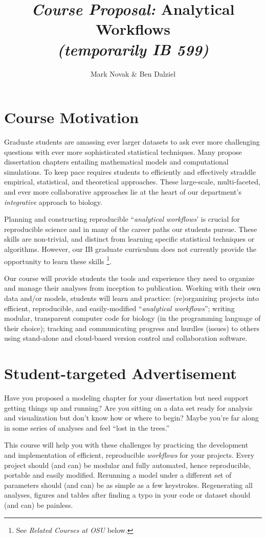 \documentclass[10pt]{article}
\author{Mark Novak \& Ben Dalziel}
\title{\emph{Course Proposal:}  Analytical Workflows\\\emph{\small{(temporarily} IB 599)}}
\date{}
\begin{document}
\maketitle

\section*{Course Motivation}
Graduate students are amassing ever larger datasets to ask ever more challenging questions with ever more sophisticated statistical techniques. Many propose dissertation chapters entailing mathematical models and computational simulations. To keep pace requires students to efficiently and effectively straddle empirical, statistical, and theoretical approaches. These large-scale, multi-faceted, and ever more collaborative approaches lie at the heart of our department's \emph{integrative} approach to biology.

Planning and constructing reproducible ``\emph{analytical workflows}' is crucial for reproducible science and in many of the career paths our students pursue. These skills are non-trivial, and distinct from learning specific statistical techniques or algorithms. However, our IB graduate curriculum does not currently provide the opportunity to learn these skills \footnote{See \emph{Related Courses at OSU} below.}. 

Our course will provide students the tools and experience they need to organize and manage their analyses from inception to publication.  Working with their own data and/or models, students will learn and practice: (re)organizing projects into efficient, reproducible, and easily-modified ``\emph{analytical workflows}''; writing modular, transparent computer code for biology (in the programming language of their choice); tracking and communicating progress and hurdles (issues) to others using stand-alone and cloud-based version control and collaboration software.

\section*{Student-targeted Advertisement}
Have you proposed a modeling chapter for your dissertation but need support getting things up and running?  Are you sitting on a data set ready for analysis and visualization but don't know how or where to begin?  Maybe you're far along in some series of analyses and feel ``lost in the trees.''

This course will help you with these challenges by practicing the development and implementation of efficient, reproducible \emph{workflows} for your projects.  Every project should (and can) be modular and fully automated, hence reproducible, portable and easily modified.  Rerunning a model under a different set of parameters should (and can) be as simple as a few keystrokes. Regenerating all analyses, figures and tables after finding a typo in your code or dataset should (and can) be painless.
\end{document}
